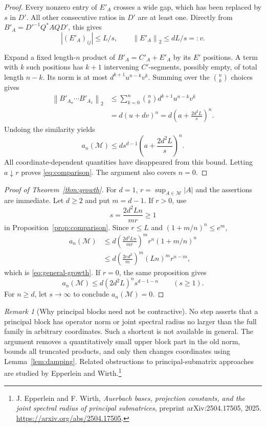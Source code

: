 \documentclass[11pt]{article}
\theoremstyle{remark}\newtheorem{remark}[theorem]{Remark}
\newcommand{\norm}[1]{\left\lVert #1\right\rVert_2}
\begin{document}
\begin{proof}
Every nonzero entry of $E'_A$ crosses a wide gap, which has been replaced by $s$ in $D'$. All other consecutive ratios in $D'$ are at least one. Directly from $B'_A=D'^{-1}Q^*AQD'$, this gives
\begin{equation}\label{eq:E-new}
 |(E'_A)_{ij}|\leq L/s,\qquad
 \norm{E'_A}\leq dL/s=:v.
\end{equation}

Expand a fixed length-$n$ product of $B'_A=C'_A+E'_A$ by its $E'$ positions. A term with $k$ such positions has $k+1$ intervening $C'$-segments, possibly empty, of total length $n-k$. Its norm is at most $d^{k+1}u^{n-k}v^k$. Summing over the $\binom nk$ choices gives
\begin{align*}
 \norm{B'_{A_n}\cdots B'_{A_1}}
 &\leq \sum_{k=0}^n\binom nk d^{k+1}u^{n-k}v^k\\
 &=d(u+dv)^n
 =d\left(a+\frac{2d^2L}{s}\right)^n.
\end{align*}
Undoing the similarity yields
\[
 a_n(\mathcal M)\leq d s^{d-1}
                \left(a+\frac{2d^2L}{s}\right)^n.
\]
All coordinate-dependent quantities have disappeared from this bound. Letting $a\downarrow r$ proves \eqref{eq:comparison}. The argument also covers $n=0$.
\end{proof}

\begin{proof}[Proof of Theorem~\ref{thm:growth}]
For $d=1$, $r=\sup_{A\in\mathcal M}|A|$ and the assertions are immediate. Let $d\geq2$ and put $m=d-1$. If $r>0$, use
\[
 s=\frac{2d^2Ln}{mr}\geq1
\]
in Proposition~\ref{prop:comparison}. Since $r\leq L$ and $(1+m/n)^n\leq e^m$,
\begin{align*}
 a_n(\mathcal M)
 &\leq d\left(\frac{2d^2Ln}{mr}\right)^m
                  r^n(1+m/n)^n\\
 &\leq d\left(\frac{2ed^2}{m}\right)^m
                  (Ln)^m r^{n-m},
\end{align*}
which is \eqref{eq:general-growth}. If $r=0$, the same proposition gives
\[
 a_n(\mathcal M)\leq d(2d^2L)^n s^{d-1-n}\qquad(s\geq1).
\]
For $n\geq d$, let $s\to\infty$ to conclude $a_n(\mathcal M)=0$.
\end{proof}

\begin{remark}[Why principal blocks need not be contractive]
No step asserts that a principal block has operator norm or joint spectral radius no larger than the full family in arbitrary coordinates. Such a shortcut is not available in general. The argument removes a quantitatively small upper block part in the old norm, bounds all truncated products, and only then changes coordinates using Lemma~\ref{lem:damping}. Related obstructions to principal-submatrix approaches are studied by Epperlein and Wirth.\footnote{J. Epperlein and F. Wirth, \emph{Auerbach bases, projection constants, and the joint spectral radius of principal submatrices}, preprint arXiv:2504.17505, 2025. \url{https://arxiv.org/abs/2504.17505}.}
\end{remark}
\end{document}

